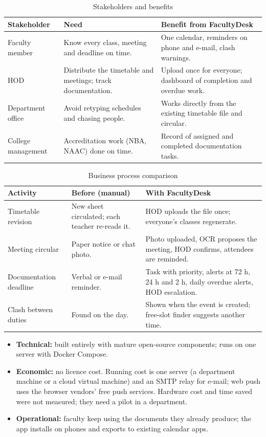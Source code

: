 {\small\begin{xltabular}{\textwidth}{|p{3.2cm}|Y|Y|}
\caption{Stakeholders and benefits}\\
\hline
\textbf{Stakeholder} & \textbf{Need} & \textbf{Benefit from FacultyDesk} \\ \hline
Faculty member & Know every class, meeting and deadline on time. & One calendar, reminders on phone and e-mail, clash warnings. \\ \hline
HOD & Distribute the timetable and meetings; track documentation. & Upload once for everyone; dashboard of completion and overdue work. \\ \hline
Department office & Avoid retyping schedules and chasing people. & Works directly from the existing timetable file and circular. \\ \hline
College management & Accreditation work (NBA, NAAC) done on time. & Record of assigned and completed documentation tasks. \\ \hline
\end{xltabular}}

{\small\begin{xltabular}{\textwidth}{|p{3.0cm}|Y|Y|}
\caption{Business process comparison}\\
\hline
\textbf{Activity} & \textbf{Before (manual)} & \textbf{With FacultyDesk} \\ \hline
Timetable revision & New sheet circulated; each teacher re-reads it. & HOD uploads the file once; everyone's classes regenerate. \\ \hline
Meeting circular & Paper notice or chat photo. & Photo uploaded, OCR proposes the meeting, HOD confirms, attendees are reminded. \\ \hline
Documentation deadline & Verbal or e-mail reminder. & Task with priority, alerts at 72 h, 24 h and 2 h, daily overdue alerts, HOD escalation. \\ \hline
Clash between duties & Found on the day. & Shown when the event is created; free-slot finder suggests another time. \\ \hline
\end{xltabular}}

\begin{itemize}
  \item \textbf{Technical:} built entirely with mature open-source components; runs on one server with Docker Compose.
  \item \textbf{Economic:} no licence cost. Running cost is one server (a department machine or a cloud virtual machine) and an SMTP relay for e-mail; web push uses the browser vendors' free push services. Hardware cost and time saved were not measured; they need a pilot in a department.
  \item \textbf{Operational:} faculty keep using the documents they already produce; the app installs on phones and exports to existing calendar apps.
\end{itemize}

